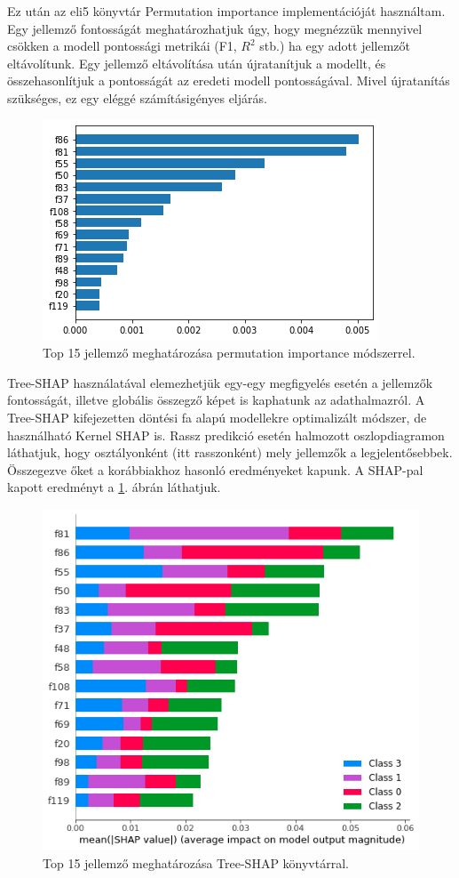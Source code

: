 Ez után az eli5 \cite{eli5_2016} könyvtár Permutation importance implementációját használtam. Egy jellemző fontosságát meghatározhatjuk úgy, hogy megnézzük mennyivel csökken a modell pontossági metrikái (F1, $R^2$ stb.) ha egy adott jellemzőt eltávolítunk. Egy jellemző eltávolítása után újratanítjuk a modellt, és összehasonlítjuk a pontosságát az eredeti modell pontosságával. Mivel újratanítás szükséges, ez egy eléggé számításigényes eljárás.
\begin{figure}[ht]
	\centering
	\includegraphics[width=0.7\columnwidth]{figures/imp_eli.png}
	\caption{Top 15 jellemző meghatározása permutation importance módszerrel.}
\end{figure}

Tree-SHAP \cite{treeshap2020} használatával elemezhetjük egy-egy megfigyelés esetén a jellemzők fontosságát, illetve globális összegző képet is kaphatunk az adathalmazról. A Tree-SHAP kifejezetten döntési fa alapú modellekre optimalizált módszer, de használható Kernel SHAP is. Rassz predikció esetén halmozott oszlopdiagramon láthatjuk, hogy osztályonként (itt rasszonként) mely jellemzők a legjelentősebbek. Összegezve őket a korábbiakhoz hasonló eredményeket kapunk. A SHAP-pal kapott eredményt a \ref{fig:shap}. ábrán láthatjuk.

\begin{figure}[ht]
	\centering
	\includegraphics[width=0.7\columnwidth]{figures/imp_shap.png}
	\caption{Top 15 jellemző meghatározása Tree-SHAP könyvtárral.}
	\label{fig:shap}
\end{figure}

